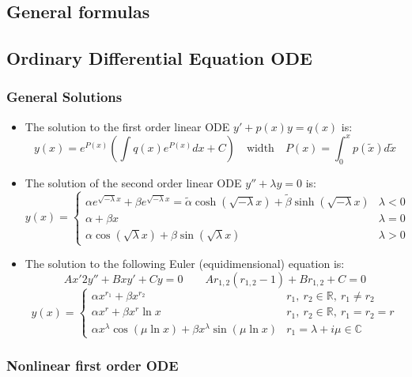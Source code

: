 \documentclass{article}
\begin{document}
\begin{twocolumn}
\section{General formulas}

\subsection{Ordinary Differential Equation ODE}

\subsubsection{General Solutions}

\begin{itemize}

\item The solution to the first order linear ODE $y' + p(x) y = q(x)$ is:
$$y(x) = e^{P(x)} \left( \int q(x) e^{P(x)} dx + C \right) \quad \text{width} \quad P(x) = \int_{0}^{x} p(\tilde x) d\tilde x$$

\item The solution of the second order linear ODE $y'' + \lambda y = 0$ is:
$$y(x) = \begin{cases} \alpha e^{\sqrt{-\lambda} x} + \beta e^{\sqrt{-\lambda} x} = \tilde \alpha \cosh \left( \sqrt{-\lambda} x \right) +\tilde \beta \sinh \left( \sqrt{-\lambda} x \right) & \lambda < 0\\
\alpha + \beta x & \lambda = 0 \\ \alpha \cos \left( \sqrt{\lambda} x \right) + \beta \sin \left( \sqrt{\lambda} x \right) & \lambda > 0 \end{cases}$$

\item The solution to the following Euler (equidimensional) equation is:
$$A x'2 y'' + B x y' + C y = 0 \qquad A r_{1,2}(r_{1,2}-1) + B r_{1,2} + C = 0$$
$$y(x) = \begin{cases}
\alpha x^{r_1} + \beta x^{r_2} & r_1, \ r_2 \in \mathbb{R},\  r_1 \neq r_2 \\
\alpha x^r + \beta x^r \ln x & r_1, \ r_2 \in \mathbb{R}, \ r_1 = r_2 = r \\
\alpha x^\lambda \cos \left( \mu \ln x \right) +\beta x^\lambda \sin \left( \mu \ln x \right) & r_1 = \lambda + i \mu \in \mathbb{C}
\end{cases}$$

\end{itemize}

\subsubsection{Nonlinear first order ODE}


\end{twocolumn}
\end{document}
